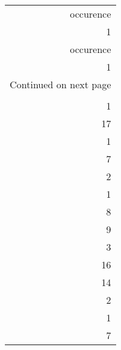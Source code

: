 \begin{longtable}{r}
\toprule
 occurence \\
         1 \\
\midrule
\endfirsthead

\toprule
 occurence \\
         1 \\
\midrule
\endhead
\midrule
\multicolumn{1}{r}{{Continued on next page}} \\
\midrule
\endfoot

\bottomrule
\endlastfoot
         3 \\
         1 \\
        17 \\
         1 \\
         7 \\
         2 \\
         1 \\
         8 \\
         9 \\
         3 \\
        16 \\
        14 \\
         2 \\
         1 \\
         7 \\
\end{longtable}
